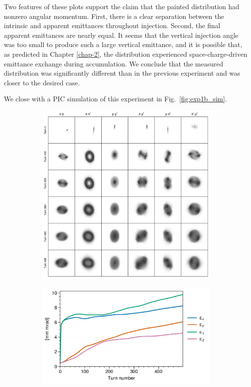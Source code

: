 %
Two features of these plots support the claim that the painted distribution had nonzero angular momentum. First, there is a clear separation between the intrinsic and apparent emittances throughout injection. Second, the final apparent emittances are nearly equal. It seems that the vertical injection angle was too small to produce such a large vertical emittance, and it is possible that, as predicted in Chapter \ref{chap-2}, the distribution experienced space-charge-driven emittance exchange during accumulation. We conclude that the measured distribution was significantly different than in the previous experiment and was closer to the desired case.

We close with a PIC simulation of this experiment in Fig.~\ref{fig:exp1b_sim}. 
%
\begin{figure}[!p]
    \centering
    \begin{subfigure}{0.85\textwidth}
        \includegraphics[width=\textwidth]{Images/chapter5/exp1b/sim_snapshots.png}
    \end{subfigure}
    \vfill
    \vspace*{1.0cm}
    \vfill
    \begin{subfigure}{0.7\textwidth}
        \includegraphics[width=\textwidth]{Images/chapter5/exp1b/sim_emittances.png}

\end{subfigure}
\end{figure}
